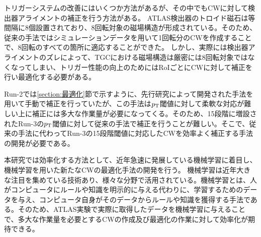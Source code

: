 トリガーシステムの改善にはいくつか方法があるが、その中でもCWに対して検出器アライメントの補正を行う方法がある。
ATLAS検出器のトロイド磁石は等間隔に8個設置されており、8回転対象の磁場構造が形成されている。そのため、従来の手法ではシミュレーションデータを用いて1回転分のCWを作成することで、8回転のすべての箇所に適応することができた。
しかし、実際には検出器アライメントのズレによって、TGCにおける磁場構造は厳密には8回転対象ではなくなってしまい、トリガー性能の向上のためにはRoIごとにCWに対して補正を行い最適化する必要がある。


Run-2では\ref{section:最適化}節で示すように、先行研究によって開発された手法を用いて手動で補正を行っていたが、この手法は$p_{\rm{T}}$閾値に対して柔軟な対応が難しい上に補正には多大な作業量が必要になってくる。そのため、15段階に増設されたRun-3の$p_{\rm{T}}$閾値に対して従来の手法で補正を行うことが難しい。そこで、従来の手法に代わってRun-3の15段階閾値に対応したCWを効率よく補正する手法の開発が必要である。

本研究では効率化する方法として、近年急速に発展している機械学習に着目し、機械学習を用いた新たなCWの最適化手法の開発を行う。
機械学習は近年大きな注目を集めている技術あり、様々な分野で活用されている。機械学習とは、人がコンピュータにルールや知識を明示的に与える代わりに、学習するためのデータを与え、コンピュータ自身がそのデータからルールや知識を獲得する手法である。そのため、ATLAS実験で実際に取得したデータを機械学習に与えることで、多大な作業量を必要とするCWの作成及び最適化の作業に対して効率化が期待できる。













